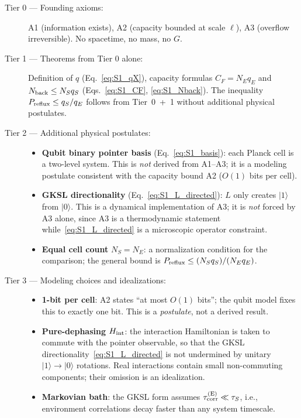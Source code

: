 \documentclass[aps,prd,twocolumn,superscriptaddress,nofootinbib,floatfix]{revtex4-2}
\begin{document}
\begin{description}
  \item[Tier 0 --- Founding axioms:]
    A1 (information exists), A2 (capacity bounded at scale $\ell$),
    A3 (overflow irreversible).  No spacetime, no mass, no $G$.

  \item[Tier 1 --- Theorems from Tier 0 alone:]
    Definition of $q$ (Eq.~\ref{eq:S1_qX}), capacity formulas
    $C_F=N_E q_E$ and $N_{\rm back}\le N_S q_S$ (Eqs.~\ref{eq:S1_CF},
    \ref{eq:S1_Nback}).  The inequality $P_{\rm reflux}\le q_S/q_E$
    follows from Tier~0~+~1 without additional physical postulates.

  \item[Tier 2 --- Additional physical postulates:]
    \begin{itemize}
      \item \textbf{Qubit binary pointer basis} (Eq.~\ref{eq:S1_basis}):
        each Planck cell is a two-level system.  This is \emph{not} derived
        from A1--A3; it is a modeling postulate consistent with the capacity
        bound A2 ($O(1)$ bits per cell).
      \item \textbf{GKSL directionality} (Eq.~\ref{eq:S1_L_directed}):
        $L$ only creates $|1\rangle$ from $|0\rangle$.  This is a dynamical
        implementation of A3; it is \emph{not} forced by A3 alone, since A3
        is a thermodynamic statement while~\eqref{eq:S1_L_directed} is a
        microscopic operator constraint.
      \item \textbf{Equal cell count} $N_S=N_E$: a normalization condition
        for the comparison; the general bound is $P_{\rm reflux}\le
        (N_S q_S)/(N_E q_E)$.
    \end{itemize}

  \item[Tier 3 --- Modeling choices and idealizations:]
    \begin{itemize}
      \item \textbf{1-bit per cell}: A2 states ``at most $O(1)$ bits''; the
        qubit model fixes this to exactly one bit.  This is a \emph{postulate},
        not a derived result.
      \item \textbf{Pure-dephasing $H_{\rm int}$}: the interaction Hamiltonian
        is taken to commute with the pointer observable, so that the GKSL
        directionality~\eqref{eq:S1_L_directed} is not undermined by unitary
        $|1\rangle\!\to\!|0\rangle$ rotations.  Real interactions contain
        small non-commuting components; their omission is an idealization.
      \item \textbf{Markovian bath}: the GKSL form assumes
        $\tau_{\rm corr}^{\rm(E)} \ll \tau_S$, i.e., environment correlations
        decay faster than any system timescale.
    \end{itemize}
\end{description}
\end{document}
